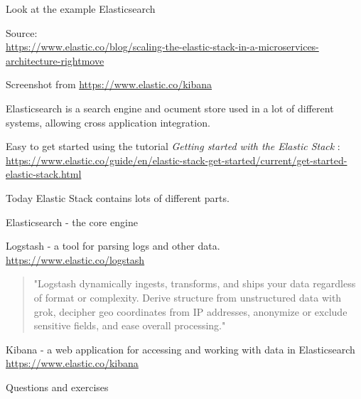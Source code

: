 \documentclass[Screen16to9,17pt]{foils}
\begin{document}

Look at the example Elasticsearch

Source:\\
{\footnotesize\url{https://www.elastic.co/blog/scaling-the-elastic-stack-in-a-microservices-architecture-rightmove}}




Screenshot from \url{https://www.elastic.co/kibana}

Elasticsearch is a search engine and ocument store used in a lot of different systems, allowing cross application integration.


Easy to get started using the tutorial \emph{Getting started with the Elastic Stack} :\\
{\footnotesize\url{https://www.elastic.co/guide/en/elastic-stack-get-started/current/get-started-elastic-stack.html}}

Today Elastic Stack contains lots of different parts.

\begin{list2}
\item Elasticsearch - the core engine
\item Logstash - a tool for parsing logs and other data.\\
\url{https://www.elastic.co/logstash}
\begin{quote}
"Logstash dynamically ingests, transforms, and ships your data regardless of format or complexity. Derive structure from unstructured data with grok, decipher geo coordinates from IP addresses, anonymize or exclude sensitive fields, and ease overall processing."
\end{quote}
\item Kibana - a web application for accessing and working with data in Elasticsearch\\
\url{https://www.elastic.co/kibana}
\end{list2}






Questions and exercises
\end{document}
